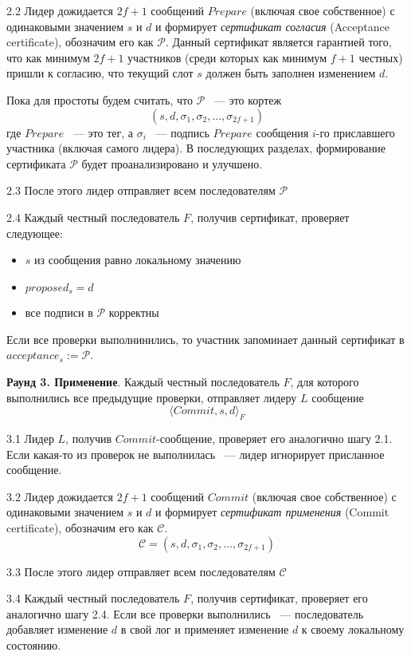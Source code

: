 2.2 Лидер дожидается $2f+1$ сообщений $Prepare$ (включая свое собственное) с одинаковыми значением $s$ и $d$ и формирует \textit{сертификат согласия} (Acceptance certificate), обозначим его как $\mathcal{P}$. Данный сертификат является гарантией того, что как минимум $2f+1$ участников (среди которых как минимум $f+1$ честных) пришли к согласию, что текущий слот $s$ должен быть заполнен изменением $d$.

Пока для простоты будем считать, что $\mathcal{P}$ ~--- это кортеж
$$(s, d, \sigma_1, \sigma_2, ..., \sigma_{2f+1})$$
где $Prepare$ ~--- это тег, а $\sigma_i$ ~--- подпись $Prepare$ сообщения $i$-го приславшего участника (включая самого лидера). 
В последующих разделах, формирование сертификата $\mathcal{P}$ будет проанализировано и улучшено.

2.3 После этого лидер отправляет всем последователям  $\mathcal{P}$

2.4 Каждый честный последователь $F$, получив сертификат, проверяет следующее:
\begin{itemize}
\item $s$ из сообщения равно локальному значению
\item $proposed_s = d$
\item все подписи в $\mathcal{P}$ корректны
\end{itemize}
\vspace{10pt}

Если все проверки выполнинились, то участник запоминает данный сертификат в $acceptance_s := \mathcal{P}$.
\vspace{10pt}

\textbf{Раунд 3. Применение}.
Каждый честный последователь $F$, для которого выполнились все предыдущие проверки, отправляет лидеру $L$ сообщение 
\[ \langle Commit, s, d \rangle_F \]

3.1 Лидер $L$, получив $Commit$-сообщение, проверяет его аналогично шагу 2.1.
Если какая-то из проверок не выполнилась ~--- лидер игнорирует присланное сообщение. 

3.2 Лидер дожидается $2f+1$ сообщений $Commit$ (включая свое собственное) с одинаковыми значением $s$ и $d$ и формирует \textit{сертификат применения} (Commit certificate), обозначим его как $\mathcal{C}$.
$$\mathcal{C}=(s, d, \sigma_1, \sigma_2, ..., \sigma_{2f+1})$$

3.3 После этого лидер отправляет всем последователям  $\mathcal{C}$

3.4 Каждый честный последователь $F$, получив сертификат, проверяет его аналогично шагу 2.4.
Если все проверки выполнились ~--- последователь добавляет изменение $d$ в свой лог и  применяет изменение $d$ к своему локальному состоянию.
\vspace{10pt}

